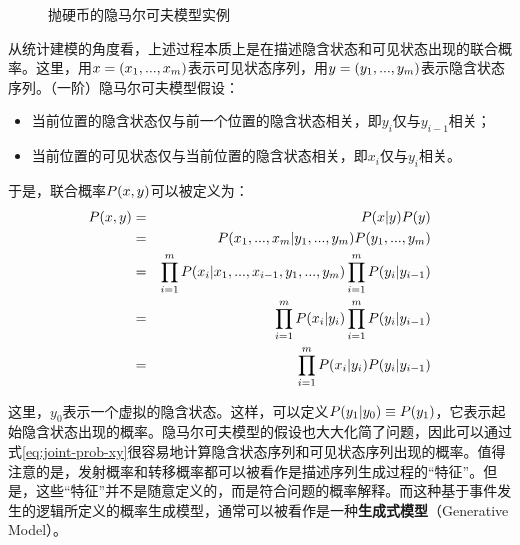 \begin{figure}[htp]
\centering

\caption{抛硬币的隐马尔可夫模型实例}
\label{fig:3.3-3}
\end{figure}
\parinterval 从统计建模的角度看，上述过程本质上是在描述隐含状态和可见状态出现的联合概率。这里，用${x}=(x_1,...,x_m)$表示可见状态序列，用${y}=(y_1,...,y_m)$表示隐含状态序列。（一阶）隐马尔可夫模型假设：

\begin{itemize}
\vspace{0.5em}
\item 当前位置的隐含状态仅与前一个位置的隐含状态相关，即$y_i$仅与$y_{i-1}$相关；
\vspace{0.5em}
\item 当前位置的可见状态仅与当前位置的隐含状态相关，即$x_i$仅与$y_i$相关。
\vspace{0.5em}
\end{itemize}

于是，联合概率${P}({x},{y})$可以被定义为：
\begin{eqnarray}
{P}({x},{y}) & = & {P}({x}|{y}){P}({y}) \nonumber \\
                                                   & = & {P}(x_1,...,x_m|y_1,...,y_m) {P}(y_1,...,y_m) \nonumber \\
                                                   & = & \prod_{i=1}^{m} {P}(x_i|x_1,...,x_{i-1},y_1,...,y_m) \prod_{i=1}^{m} {P}(y_i | y_{i-1}) \nonumber \\
                                                   & = & \prod_{i=1}^{m} {P}(x_i|y_i) \prod_{i=1}^{m} {P}(y_i | y_{i-1}) \nonumber \\
                                                   & = & \prod_{i=1}^{m} {P}(x_i|y_i) {P}(y_i | y_{i-1})  \label{eq:joint-prob-xy}
\end{eqnarray}

\noindent 这里，$y_{0}$表示一个虚拟的隐含状态。这样，可以定义${P}(y_1|y_{0}) \equiv {P}(y_1)$，它表示起始隐含状态出现的概率。隐马尔可夫模型的假设也大大化简了问题，因此可以通过式\eqref{eq:joint-prob-xy}很容易地计算隐含状态序列和可见状态序列出现的概率。值得注意的是，发射概率和转移概率都可以被看作是描述序列生成过程的“特征”。但是，这些“特征”并不是随意定义的，而是符合问题的概率解释。而这种基于事件发生的逻辑所定义的概率生成模型，通常可以被看作是一种{\small\sffamily\bfseries{生成式模型}}（Generative Model）。

